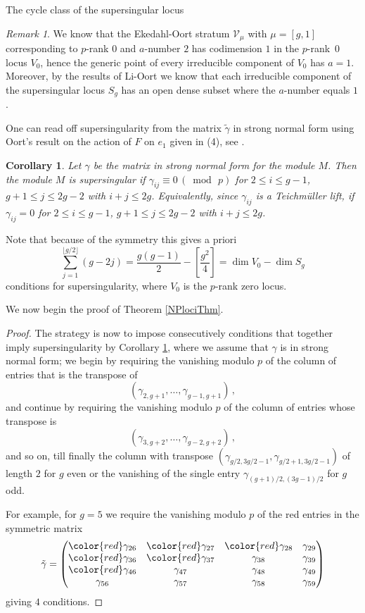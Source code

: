 \documentclass[11pt]{amsart}
\numberwithin{equation}{section}
\newtheorem{corollary}[theorem]{Corollary}
\theoremstyle{definition}
\theoremstyle{remark}
\newtheorem{remark}[theorem]{Remark}
\begin{document}
\begin{section}{The cycle class of the supersingular locus}
\begin{remark}
We know that the Ekedahl-Oort stratum $\mathcal{V}_{\mu}$ with $\mu=[g,1]$
corresponding to $p$-rank $0$ and $a$-number $2$ has codimension $1$ in 
the $p$-rank~$0$ locus $V_0$,
hence the generic point of every irreducible component of $V_0$ has $a=1$.
Moreover, by the results of Li-Oort \cite{L-O} we know that each irreducible
component of the supersingular locus $S_g$ has an open dense subset where 
the $a$-number equals $1$. 
\end{remark}
One can read off supersingularity from the matrix $\tilde{\gamma}$ in strong normal form using
Oort's result on the action of $F$ on $e_1$ given in (4), 
see \cite[Cor.\ 2.8]{Oort-AM152}.

\begin{corollary}\label{ss-criterion} Let $\gamma$ be the matrix in strong normal form
for the module $M$. 
Then the module $M$ is supersingular if 
$\gamma_{ij}\equiv 0 \, (\bmod \, p)$ 
for $2 \leq i \leq g-1$,
$g+1 \leq j \leq 2g-2$ with $i+j\leq 2g$.
Equivalently, since $\gamma_{ij}$ is a Teichm\"uller lift, if $\gamma_{ij}=0$ 
for $2 \leq i \leq g-1$,
$g+1 \leq j \leq 2g-2$ with $i+j\leq 2g$.
\end{corollary}
Note that because of the symmetry this gives a priori
$$
\sum_{j=1}^{\lfloor g/2 \rfloor} (g-2j) 
=\frac{g(g-1)}{2}- [\frac{g^2}{4}]= \dim V_0 - \dim S_g
$$ 
conditions for supersingularity, 
where $V_0$ is the $p$-rank zero locus. 

We now begin the proof of Theorem \ref{NPlociThm}.
\begin{proof}
The strategy is now to impose consecutively conditions that together imply
supersingularity by Corollary \ref{ss-criterion}, where 
we assume that $\gamma$ is in strong normal form; we begin by requiring the vanishing
modulo $p$ of the column of entries that is the transpose of
$$
(\gamma_{2,g+1},\ldots,\gamma_{g-1,g+1})\, ,
$$
and continue by requiring the vanishing modulo $p$ of the column of entries
whose transpose is
$$
(\gamma_{3,g+2},\ldots,\gamma_{g-2,g+2})\, ,
$$
and so on, 
till finally 
the column with transpose $(\gamma_{g/2,3g/2-1},\gamma_{g/2+1,3g/2-1})$ of length $2$
for $g$ even or the vanishing of the single entry
$\gamma_{(g+1)/2,(3g-1)/2}$ for $g$ odd.

For example, for $g=5$ we require the vanishing modulo $p$ of the red entries in the symmetric matrix
$$
\tilde{\gamma} =\left(
\begin{matrix}
\color{red}\gamma_{26} & \color{red}\gamma_{27} &\color{red}\gamma_{28}& \gamma_{29} \\
\color{red}\gamma_{36} & \color{red}\gamma_{37} & \gamma_{38} & \gamma_{39}\\
\color{red}\gamma_{46} & \gamma_{47} & \gamma_{48} & \gamma_{49} \\
\gamma_{56} & \gamma_{57} & \gamma_{58} & \gamma_{59} \\
\end{matrix} \right)
$$
giving $4$ conditions.


\end{proof}
\end{section}
\end{document}
